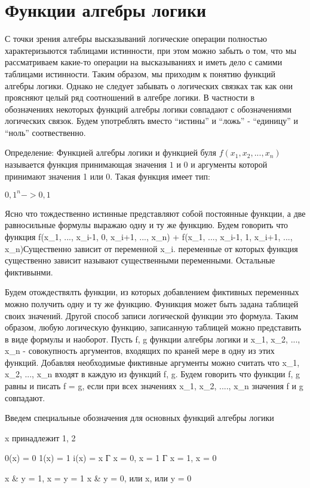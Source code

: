 \section{Функции алгебры логики}
С точки зрения алгебры высказываний логические операции полностью характеризыются таблицами истинности,
при этом можно забыть о том, что мы рассматриваем какие-то операции на высказываниях и иметь дело с самими таблицами истинности.
Таким образом, мы приходим к понятию функций алгебры логики.
Однако не следует забывать о логических связках так как они проясняют целый ряд соотношений в алгебре логики.
В частности в обозначениях некоторых функций алгебры логики совпадают с обозначениями логических связок.
Будем употреблять вместо ``истины'' и ``ложь'' - ``единицу'' и ``ноль'' соотвественно.

Определение:
Функцией алгебры логики и функцией буля $f(x_1, x_2, ..., x_n)$ называется функция принимающая значения $1$ и $0$ и аргументы которой принимают значения 1 или 0. Такая функция имеет тип:

${0, 1}^n -> {0, 1}$

Ясно что тождественно истинные представляют собой постоянные функции, а две равносильные формулы выражаю одну и ту же функцию. Будем говорить что функция f(x_1, ...,  x_i-1, 0, x_i+1, ..., x_n) + f(x_1, ..., x_i-1, 1, x_i+1, ..., x_n)Существенно зависит от переменной x_i. переменные от которых функция существенно зависит называют существенными переменными. Остальные фиктивынми.

Будем отождествялть функции, из которых добавлением фиктивных переменных можно получить одну и ту же функцию.
Фуникция может быть задана таблицей своих значений. Другой способ записи логической функции это формула. Таким образом, любую логическую функцию, записанную таблицей можно представить в виде формулы и наоборот. Пусть f, g функции алгебры логики и x_1, x_2, ..., x_n - совокупность аргументов, входящих по краней мере в одну из этих функций. Добавляя необходимые фиктивные аргументы можно считать что x_1, x_2, ..., x_n входят в каждую из функций f, g. Будем говорить что функции f, g равны и писать f = g, если при всех значениях x_1, x_2, ...., x_n значения f и g совпадают.

Введем специальные обозначения для основных функций алгебры логики

x принадлежит {1, 2}

0(x) = 0
1(x) = 1
i(x) = x
Г x = 0, x = 1
Г x = 1, x = 0

x & y = 1, x = y = 1
x & y = 0, или x, или y = 0


